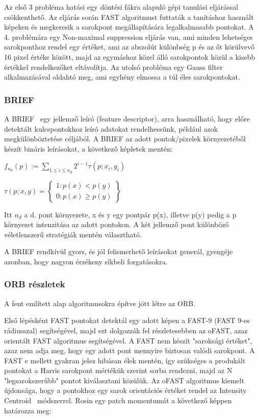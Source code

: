 Az első 3 probléma hatási egy döntési fákra alapuló gépi tanulási eljárással csökkenthető.
Az eljárás során FAST algoritmust futtaták a tanításhoz használt képeken és megkeresik a sarokpont megállapítására legalkalmasabb pontokat.
A 4. problémára egy Non-maximal suppression eljárás van, ami minden lehetséges sarokponthoz rendel egy értéket, ami az abszolút különbség p és az őt körülvevő 16 pixel értéke között, majd az egymáshoz közel álló sarokpontok közül a kisebb értékkel rendelkezőket eltávolítja.
Az utolsó probléma egy Gauss filter alkalmazásával oldahtó meg, ami egyhény elmossa a túl éles sarokpontokat.

\subsubsection{BRIEF}

A BRIEF~\cite{calonder2010brief} egy jellemző leíró (feature descriptor), arra használható, hogy előre detektált kulcspontokhoz leíró adatokat rendelhessünk, például azok megkülönböztetése céljából.
A BRIEF az adott pontok/pixelek környezetéből készít bináris leírásokat, a következő képletek mentén:

$ f_{n_{d}}(p) := \sum_{1\leq i\leq n_{d}}^{}2^{i-1}\tau (p;x_{i},y_{i}) $

$ \tau (p;x,y)=\begin{Bmatrix}
	1 : p(x) < p(y) \\ 
	0 : p(x) \geq p(y)
\end{Bmatrix} $

Itt $ n_{d} $ a d. pont környezete, x és y egy pontpár p(x), illetve p(y) pedig a p környezet intenzitása az adott pontokon.
A két jellemző pont különböző véletlenszerű stratégiák mentén választható.

A BRIEF rendkívül gyors, és jól felismerhető leírásokat generál, gyengéje azonban, hogy nagyon érzékeny síkbeli forgatásokra.

\subsubsection{ORB részletek}

A fent említett alap algoritmusokra építve jött létre az ORB.

Első lépésként FAST pontokat detektál egy adott képen a FAST-9 (FAST 9-es rádiusszal) segítségével, majd ezt dolgozzák fel részletesebben az oFAST, azaz orientált FAST algoritmus segítségével.
A FAST nem készít "saroksági értéket", azaz nem adja meg, hogy egy adott pont mennyire biztosan valódi sarokpont.
A FAST e mellett gyakran jelez hibásan élek mentén, így szükséges a produkált pontokat a Harris sarokpont mértékük szerint sorba rendezni, majd az N "legsarokszerűbb" pontot kiválasztani közülük.
Az oFAST algoritmus kiemelt újdonsága, hogy a pontokhoz egy sarok orientációs értéket rendel az Intensity Centroid~\cite{rosin1999measuring} módszerrel.
Rosin egy patch momentumát a következő képpen határozza meg:

